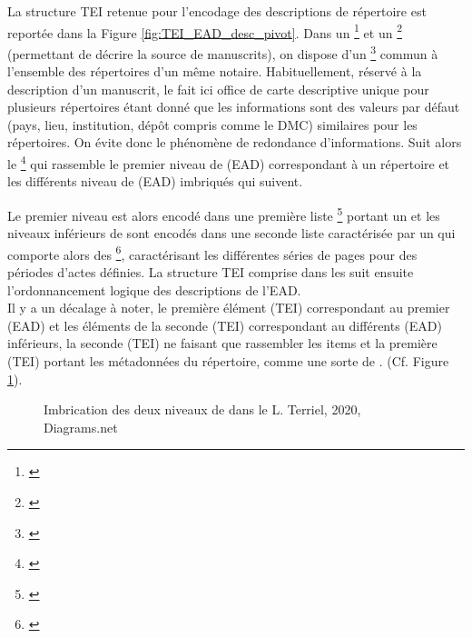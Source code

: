 La structure TEI retenue pour l'encodage des descriptions de répertoire est reportée dans la Figure \ref{fig:TEI_EAD_desc_pivot}. Dans un \footnote{\cite{tei_tei_nodate-6}} et un \footnote{\cite{tei_tei_nodate-4}} (permettant de décrire la source de manuscrits), on dispose d'un \footnote{\cite{tei_tei_nodate-22}} commun à l'ensemble des répertoires d'un même notaire. Habituellement, réservé à la description d'un manuscrit, le  fait ici office de carte descriptive unique pour plusieurs répertoires étant donné que les informations sont des valeurs par défaut (pays, lieu, institution, dépôt compris comme le DMC) similaires pour les répertoires. On évite donc le phénomène de redondance d'informations. Suit alors le \footnote{\cite{tei_tei_nodate-5}} qui rassemble le premier niveau de  (EAD) correspondant à un répertoire et les différents niveau de  (EAD) imbriqués qui suivent. 

Le premier niveau est alors encodé dans une première liste \footnote{\cite{tei_tei_nodate-21}} portant un   et les niveaux inférieurs de  sont encodés dans une seconde liste  caractérisée par un   qui comporte alors des \footnote{\cite{tei_tei_nodate-20}}, caractérisant les différentes séries de pages pour des périodes d'actes définies. La structure TEI comprise dans les  suit ensuite l'ordonnancement logique des descriptions de l'EAD.\\

Il y a un décalage à noter, le première élément  (TEI) correspondant au premier  (EAD) et les éléments  de la seconde  (TEI) correspondant au différents  (EAD) inférieurs, la seconde  (TEI) ne faisant que rassembler les items et la première  (TEI) portant les métadonnées du répertoire, comme une sorte de . (Cf. Figure \ref{fig:metaliste}).\\

\begin{figure}[h]
    \centering
    \centerline{}
    \caption{Imbrication des deux niveaux de  dans le  \textcopyright L. Terriel, 2020, Diagrams.net}
    \label{fig:metaliste}
\end{figure}

